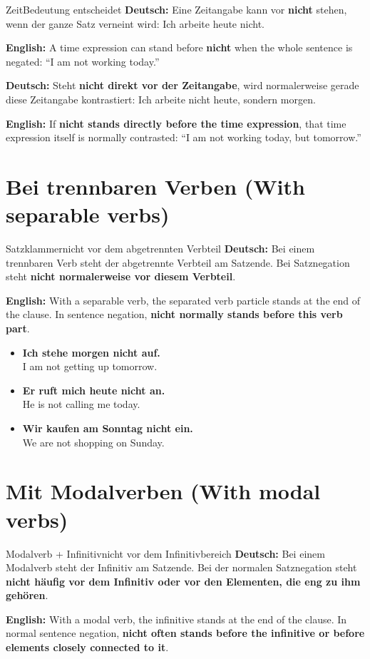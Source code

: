 \documentclass[a4paper,11pt]{article}
\newcommand{\GermanText}[1]{\textbf{Deutsch: }#1\par}
\newcommand{\EnglishText}[1]{{\small\color{SoftGray}\textbf{English: }#1\par}}
\newcommand{\ExampleItem}[2]{\item \textbf{#1}\\{\small\color{SoftGray}#2}}
\begin{document}
\begin{grammarentry}{Zeit}{Bedeutung entscheidet}
\GermanText{Eine Zeitangabe kann vor \textbf{nicht} stehen, wenn der ganze Satz verneint wird: \glqq Ich arbeite heute nicht.\grqq}
\EnglishText{A time expression can stand before \textbf{nicht} when the whole sentence is negated: ``I am not working today.''}

\GermanText{Steht \textbf{nicht direkt vor der Zeitangabe}, wird normalerweise gerade diese Zeitangabe kontrastiert: \glqq Ich arbeite nicht heute, sondern morgen.\grqq}
\EnglishText{If \textbf{nicht stands directly before the time expression}, that time expression itself is normally contrasted: ``I am not working today, but tomorrow.''}
\end{grammarentry}

\section{Bei trennbaren Verben \textnormal{(With separable verbs)}}

\begin{grammarentry}{Satzklammer}{nicht vor dem abgetrennten Verbteil}
\GermanText{Bei einem trennbaren Verb steht der abgetrennte Verbteil am Satzende. Bei Satznegation steht \textbf{nicht normalerweise vor diesem Verbteil}.}
\EnglishText{With a separable verb, the separated verb particle stands at the end of the clause. In sentence negation, \textbf{nicht normally stands before this verb part}.}
\end{grammarentry}

\begin{exbox}
\begin{itemize}
\ExampleItem{Ich stehe morgen \textbf{nicht auf}.}{I am not getting up tomorrow.}
\ExampleItem{Er ruft mich heute \textbf{nicht an}.}{He is not calling me today.}
\ExampleItem{Wir kaufen am Sonntag \textbf{nicht ein}.}{We are not shopping on Sunday.}
\end{itemize}
\end{exbox}

\section{Mit Modalverben \textnormal{(With modal verbs)}}

\begin{grammarentry}{Modalverb + Infinitiv}{nicht vor dem Infinitivbereich}
\GermanText{Bei einem Modalverb steht der Infinitiv am Satzende. Bei der normalen Satznegation steht \textbf{nicht häufig vor dem Infinitiv oder vor den Elementen, die eng zu ihm gehören}.}
\EnglishText{With a modal verb, the infinitive stands at the end of the clause. In normal sentence negation, \textbf{nicht often stands before the infinitive or before elements closely connected to it}.}
\end{grammarentry}
\end{document}
